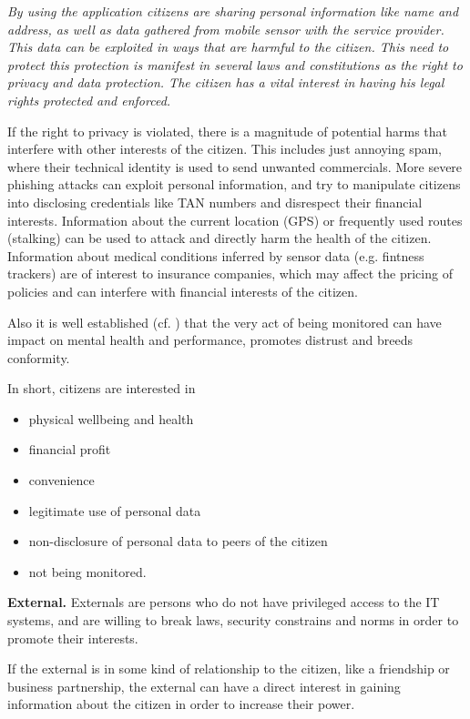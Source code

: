 \documentclass[runningheads,a4paper]{llncs}
\newenvironment{LGContent}
{ \par\color{blue} \it \small }
{ \par }
\begin{document}
\begin{LGContent}
By using the application citizens are sharing personal information like name and address, as well as data gathered from mobile sensor with the service provider.
This data can be exploited in ways that are harmful to the citizen.
This need to protect this protection is manifest in several laws and constitutions as the right to privacy and data protection.
The citizen has a vital interest in having his legal rights protected and enforced.

If the right to privacy is violated, there is a magnitude of potential harms that interfere with other interests of the citizen.
This includes just annoying spam, where their technical identity is used to send unwanted commercials.
More severe phishing attacks can exploit personal information, and try to manipulate citizens into disclosing credentials like TAN numbers and disrespect their financial interests.
Information about the current location (GPS) or frequently used routes (stalking) can be used to attack and directly harm the health of the citizen.
Information about medical conditions inferred by sensor data (e.g. fintness trackers) are of interest to insurance companies, which may affect the pricing of policies and can interfere with financial interests of the citizen.

Also it is well established (cf. \cite{GuardienMassSurveillance}) that the very act of being monitored can have impact on mental health and performance, promotes distrust and breeds conformity.

In short, citizens are interested in
\begin{itemize}
\item physical wellbeing and health
\item financial profit
\item convenience
\item legitimate use of personal data
\item non-disclosure of personal data to peers of the citizen
\item not being monitored.
\end{itemize}

\textbf{External.}
Externals are persons who do not have privileged access to the IT systems, and are willing to break laws, security constrains and norms in order to promote their interests.

If the external is in some kind of relationship to the citizen, like a friendship or business partnership, the external can have a direct interest in gaining information about the citizen in order to increase their power.


\end{LGContent}
\end{document}
